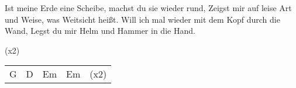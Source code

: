 \begin{guitar}
	Ist meine Erde eine Scheibe, machst du sie wieder rund,
	Zeigst mir auf leise Art und Weise, was Weitsicht heißt.
	Will ich mal wieder mit dem Kopf durch die Wand,
	Legst du mir Helm und Hammer in die Hand.
	
	  (x2)
	
	{\footnotesize\begin{tabular}{l|l|l|l l}
			G & D & Em & Em & (x2)
	\end{tabular}}
\end{guitar}